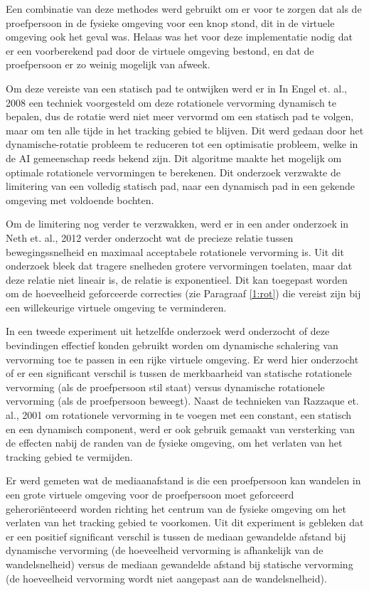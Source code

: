 Een combinatie van deze methodes werd gebruikt om er voor te zorgen dat als de
proefpersoon in de fysieke omgeving voor een knop stond, dit in de virtuele
omgeving ook het geval was. Helaas was het voor deze implementatie nodig dat er
een voorberekend pad door de virtuele omgeving bestond, en dat de proefpersoon
er zo weinig mogelijk van afweek.

Om deze vereiste van een statisch pad te ontwijken werd er in In Engel et. al., 
2008 \cite{engel08} een techniek voorgesteld om deze rotationele vervorming 
dynamisch te bepalen, dus de rotatie werd niet meer vervormd om een statisch pad
te volgen, maar om ten alle tijde in het tracking gebied te blijven. Dit werd 
gedaan door het dynamische-rotatie probleem te reduceren tot een optimisatie 
probleem, welke in de AI gemeenschap reeds bekend zijn. Dit algoritme maakte het 
mogelijk om optimale rotationele vervormingen te berekenen. Dit onderzoek 
verzwakte de limitering van een volledig statisch pad, naar een dynamisch pad in 
een gekende omgeving met voldoende bochten.

Om de limitering nog verder te verzwakken, werd er in een ander onderzoek in Neth 
et. al., 2012 \cite{neth12} verder onderzocht wat de precieze relatie tussen 
bewegingssnelheid en maximaal acceptabele rotationele vervorming is. Uit dit 
onderzoek bleek dat tragere snelheden grotere vervormingen toelaten, maar dat 
deze relatie niet lineair is, de relatie is exponentieel. Dit kan toegepast 
worden om de hoeveelheid geforceerde correcties (zie Paragraaf \ref{1:rot}) die
vereist zijn bij een willekeurige virtuele omgeving te verminderen.

In een tweede experiment uit hetzelfde onderzoek \cite{neth12} werd onderzocht 
of deze bevindingen effectief konden gebruikt worden om dynamische schalering van 
vervorming toe te passen in een rijke virtuele omgeving. Er werd hier onderzocht 
of er een significant verschil is tussen de merkbaarheid van statische 
rotationele vervorming (als de proefpersoon stil staat) versus dynamische 
rotationele vervorming (als de proefpersoon beweegt). Naast de technieken van 
Razzaque et. al., 2001 \cite{kohn01} om rotationele vervorming in te voegen met 
een constant, een statisch en een dynamisch component, werd er ook gebruik 
gemaakt van versterking van de effecten nabij de randen van de fysieke omgeving, 
om het verlaten van het tracking gebied te vermijden. 

Er werd gemeten wat de mediaanafstand is die een proefpersoon kan wandelen in een 
grote virtuele omgeving voor de proefpersoon moet geforceerd geherori\"enteeerd 
worden richting het centrum van de fysieke omgeving om het verlaten van het 
tracking gebied te voorkomen. Uit dit experiment is gebleken dat er een positief 
significant verschil is tussen de mediaan gewandelde afstand bij dynamische 
vervorming (de hoeveelheid vervorming is afhankelijk van de wandelsnelheid) 
versus de mediaan gewandelde afstand bij statische vervorming (de hoeveelheid
vervorming wordt niet aangepast aan de wandelsnelheid).

